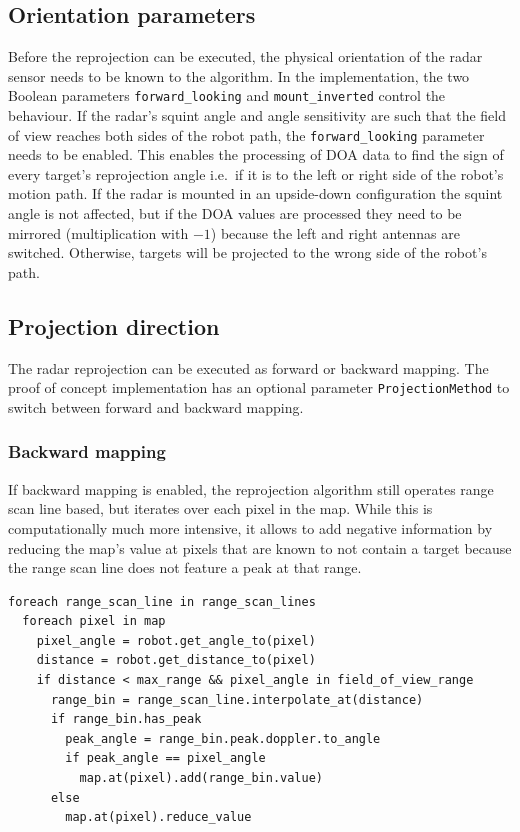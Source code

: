\subsection{Orientation parameters}\label{orientation-parameters}

Before the reprojection can be executed, the physical orientation of the
radar sensor needs to be known to the algorithm. In the implementation,
the two Boolean parameters \texttt{forward\_looking} and
\texttt{mount\_inverted} control the behaviour. If the radar's squint
angle and angle sensitivity are such that the field of view reaches both
sides of the robot path, the \texttt{forward\_looking} parameter needs
to be enabled. This enables the processing of DOA data to find the sign
of every target's reprojection angle i.e.~if it is to the left or right
side of the robot's motion path. If the radar is mounted in an
upside-down configuration the squint angle is not affected, but if the
DOA values are processed they need to be mirrored (multiplication with
\(-1\)) because the left and right antennas are switched. Otherwise,
targets will be projected to the wrong side of the robot's path.

\subsection{Projection direction}\label{projection-direction}

The radar reprojection can be executed as forward or backward mapping.
The proof of concept implementation has an optional parameter
\texttt{ProjectionMethod} to switch between forward and backward
mapping.

\subsubsection{Backward mapping}\label{backward-mapping}

If backward mapping is enabled, the reprojection algorithm still
operates range scan line based, but iterates over each pixel in the map.
While this is computationally much more intensive, it allows to add
negative information by reducing the map's value at pixels that are
known to not contain a target because the range scan line does not
feature a peak at that range.

\begin{verbatim}
foreach range_scan_line in range_scan_lines
  foreach pixel in map
    pixel_angle = robot.get_angle_to(pixel)
    distance = robot.get_distance_to(pixel)
    if distance < max_range && pixel_angle in field_of_view_range
      range_bin = range_scan_line.interpolate_at(distance)
      if range_bin.has_peak
        peak_angle = range_bin.peak.doppler.to_angle
        if peak_angle == pixel_angle
          map.at(pixel).add(range_bin.value)
      else
        map.at(pixel).reduce_value
\end{verbatim}

